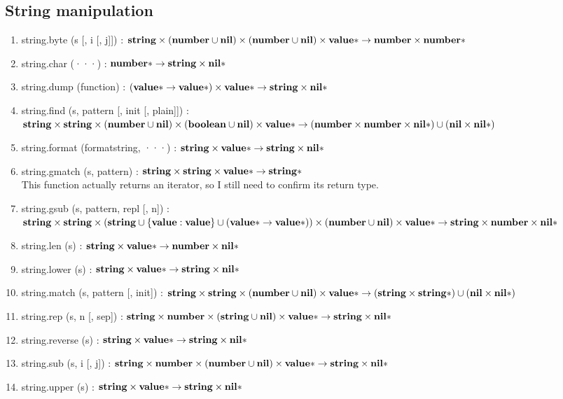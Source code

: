 \subsection{String manipulation}

\begin{enumerate}
\item string.byte (s [, i [, j]]) :
$\mathbf{string} \times
(\mathbf{number} \cup \mathbf{nil}) \times
(\mathbf{number} \cup \mathbf{nil}) \times
\mathbf{value}{*} \rightarrow
\mathbf{number} \times
\mathbf{number}{*}$
\item string.char (···) :
$\mathbf{number}{*} \rightarrow
\mathbf{string} \times
\mathbf{nil}{*}$
\item string.dump (function) :
$(\mathbf{value}{*} \rightarrow \mathbf{value}{*}) \times
\mathbf{value}{*} \rightarrow
\mathbf{string} \times
\mathbf{nil}{*}$
\item string.find (s, pattern [, init [, plain]]) :
$\mathbf{string} \times
\mathbf{string} \times
(\mathbf{number} \cup \mathbf{nil}) \times
(\mathbf{boolean} \cup \mathbf{nil}) \times
\mathbf{value}{*} \rightarrow
(\mathbf{number} \times \mathbf{number} \times \mathbf{nil}{*}) \cup
(\mathbf{nil} \times \mathbf{nil}{*})$
\item string.format (formatstring, ···) :
$\mathbf{string} \times
\mathbf{value}{*} \rightarrow
\mathbf{string} \times
\mathbf{nil}{*}$
\item string.gmatch (s, pattern) :
$\mathbf{string} \times
\mathbf{string} \times
\mathbf{value}{*} \rightarrow
\mathbf{string}{*}$
\\
This function actually returns an iterator,
so I still need to confirm its return type.
\item string.gsub (s, pattern, repl [, n]) :
$\mathbf{string} \times
\mathbf{string} \times
(\mathbf{string} \cup \{ \mathbf{value}:\mathbf{value} \} \cup (\mathbf{value}{*} \rightarrow \mathbf{value}{*})) \times
(\mathbf{number} \cup \mathbf{nil}) \times
\mathbf{value}{*} \rightarrow
\mathbf{string} \times
\mathbf{number} \times
\mathbf{nil}{*}$
\item string.len (s) :
$\mathbf{string} \times
\mathbf{value}{*} \rightarrow
\mathbf{number} \times
\mathbf{nil}{*}$
\item string.lower (s) :
$\mathbf{string} \times
\mathbf{value}{*} \rightarrow
\mathbf{string} \times
\mathbf{nil}{*}$
\item string.match (s, pattern [, init]) :
$\mathbf{string} \times
\mathbf{string} \times
(\mathbf{number} \cup \mathbf{nil}) \times
\mathbf{value}{*} \rightarrow
(\mathbf{string} \times \mathbf{string}{*}) \cup
(\mathbf{nil} \times \mathbf{nil}{*})$
\item string.rep (s, n [, sep]) :
$\mathbf{string} \times
\mathbf{number} \times
(\mathbf{string} \cup \mathbf{nil}) \times
\mathbf{value}{*} \rightarrow
\mathbf{string} \times
\mathbf{nil}{*}$
\item string.reverse (s) :
$\mathbf{string} \times
\mathbf{value}{*} \rightarrow
\mathbf{string} \times
\mathbf{nil}{*}$
\item string.sub (s, i [, j]) :
$\mathbf{string} \times
\mathbf{number} \times
(\mathbf{number} \cup \mathbf{nil}) \times
\mathbf{value}{*} \rightarrow
\mathbf{string} \times
\mathbf{nil}{*}$
\item string.upper (s) :
$\mathbf{string} \times
\mathbf{value}{*} \rightarrow
\mathbf{string} \times
\mathbf{nil}{*}$
\end{enumerate}

